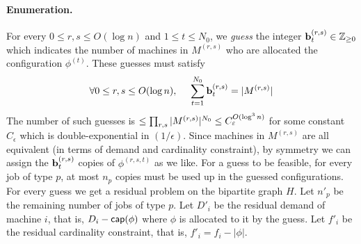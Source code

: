 \paragraph{Enumeration.}
For every $0\leq r,s \leq O(\log n)$ and $1\le t\le N_0$, we {\em guess}  the  integer $\mathbf{b}^{(r,s)}_t \in {\mathbb Z}_{\geq 0}$ which indicates the number of machines in $M^{(r,s)}$ who are allocated the configuration $\phi^{(t)}$.
These guesses must satisfy
\begin{equation}\label{feq:milp1}
\forall 0\leq r,s \leq O(\log n), ~~~~ \sum_{t=1}^{N_0} \mathbf{b}^{(r,s)}_t = |M^{(r,s)}|
\end{equation}
The number of such guesses is $\leq \prod_{r,s} |M^{(r,s)}|^{N_0} \leq C_\varepsilon^{O(\log^3 n)}$ for some constant $C_\epsilon$ which is double-exponential in $(1/\epsilon)$.
Since machines in $M^{(r,s)}$ are all equivalent (in terms of demand and cardinality constraint), by symmetry we can assign the $\mathbf{b}^{(r,s)}_t$ copies of $\phi^{(r,s,t)}$ as we like.
For a guess to be feasible, for every job of type $p$, at most $n_p$ copies must be used up in the guessed configurations.
For every guess we get a residual problem on the bipartite graph $H$.
Let $n'_p$ be the remaining number of jobs of type $p$.
Let $D'_i$ be the residual demand of machine $i$, that is, $D_i - \mathsf{cap}(\phi)$ where $\phi$ is allocated to it by the guess.
Let $f'_i$ be the residual cardinality constraint, that is, $f'_i = f_i - |\phi|$.
